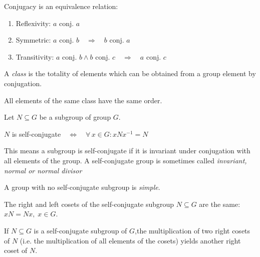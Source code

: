 \begin{thm}\label{thm:14_conj-eqv}
Conjugacy is an equivalence relation:
\begin{enumerate}
	\item Reflexivity: $a$ conj. $a$
	\item Symmetric: $a$ conj. $b \quad \Rightarrow \quad b$ conj. $a$
	\item Transitivity: $a$ conj. $b \wedge b$ conj. $c \quad \Rightarrow \quad a$ conj. $c$
\end{enumerate}
\end{thm}

\begin{dfn}[Class]\label{dfn:15_class}
A \textit{class} is the totality of elements which can be obtained from a group element by conjugation.
\end{dfn}

\begin{thm}\label{thm:15_class-order}
All elements of the same class have the same order. 
\end{thm}

\begin{dfn}\label{dfn:16_self-conj}
Let $N \subseteq G$ be a subgroup of group $G$. \par
$N$  is self-conjugate$\quad \Leftrightarrow \quad \forall \, x \in G: xNx^{-1} = N$ 
\end{dfn}
This means a subgroup is self-conjugate if it is invariant under conjugation with all elements of the group. A self-conjugate group is sometimes called \textit{invariant, normal or normal divisor} 

\begin{dfn}\label{dfn:17_simple-gr}
A group with no self-conjugate subgroup is \textit{simple}.
\end{dfn}

\begin{thm}\label{thm:16_lr-cosets}
The right and left cosets of the self-conjugate subgroup $N \subseteq G$ are the same: $xN = Nx, \; x \in G$. 
\end{thm}

\begin{thm}\label{thm:17_multipl-cosets}
If $N \subseteq G$ is a self-conjugate subgroup of $G$,the multiplication of two right cosets of $N$ (i.e. the multiplication of all elements of the cosets) yields another right coset of $N$. 
\end{thm}



